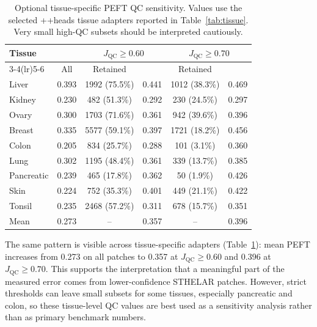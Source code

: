 \begin{table}
\caption{Optional tissue-specific PEFT QC sensitivity. Values use the selected
\LoRA{}+\AF{}+heads tissue adapters reported in Table~\ref{tab:tissue}.
Very small high-QC subsets should be interpreted cautiously.}
\label{tab:tissue-qc}
\centering
{\fontsize{8}{9}\selectfont
\begin{tabular}{lccccc}
\toprule
Tissue & \mPQ{} & \multicolumn{2}{c}{\(J_{\mathrm{QC}}\ge0.60\)} &
\multicolumn{2}{c}{\(J_{\mathrm{QC}}\ge0.70\)} \\
\cmidrule(lr){3-4}\cmidrule(lr){5-6}
 & All & Retained & \mPQ{} & Retained & \mPQ{} \\
\midrule
Liver & 0.393 & 1992 (75.5\%) & 0.441 & 1012 (38.3\%) & 0.469 \\
Kidney & 0.230 & 482 (51.3\%) & 0.292 & 230 (24.5\%) & 0.297 \\
Ovary & 0.300 & 1703 (71.6\%) & 0.361 & 942 (39.6\%) & 0.396 \\
Breast & 0.335 & 5577 (59.1\%) & 0.397 & 1721 (18.2\%) & 0.456 \\
Colon & 0.205 & 834 (25.7\%) & 0.288 & 101 (3.1\%) & 0.360 \\
Lung & 0.302 & 1195 (48.4\%) & 0.361 & 339 (13.7\%) & 0.385 \\
Pancreatic & 0.239 & 465 (17.8\%) & 0.362 & 50 (1.9\%) & 0.426 \\
Skin & 0.224 & 752 (35.3\%) & 0.401 & 449 (21.1\%) & 0.422 \\
Tonsil & 0.235 & 2468 (57.2\%) & 0.311 & 678 (15.7\%) & 0.351 \\
\midrule
Mean & 0.273 & -- & 0.357 & -- & 0.396 \\
\bottomrule
\end{tabular}
}
\end{table}

The same pattern is visible across tissue-specific adapters
(Table~\ref{tab:tissue-qc}): mean PEFT \mPQ{} increases from 0.273 on all
patches to 0.357 at \(J_{\mathrm{QC}}\ge0.60\) and 0.396 at
\(J_{\mathrm{QC}}\ge0.70\). This supports the interpretation that a meaningful
part of the measured error comes from lower-confidence STHELAR patches. However,
strict thresholds can leave small subsets for some tissues, especially
pancreatic and colon, so these tissue-level QC values are best used as a
sensitivity analysis rather than as primary benchmark numbers.
